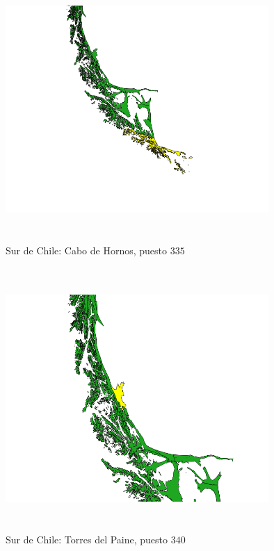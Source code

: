 \documentclass[20pt]{report}
\begin{document}
\begin{itemize}
\begin{figure}[H]
\begin{center}
\includegraphics[width=10cm, height=10cm]{cabodehornos.png}
\vspace{-0.5cm} %
\caption{Sur de Chile: Cabo de Hornos, puesto $335$}
\label{Label para referencia}
\end{center}
\end{figure}










\begin{figure}[H]
\begin{center}
\includegraphics[width=10cm, height=10cm]{torresdelpaine340.png}
\vspace{-0.5cm} %
\caption{Sur de Chile: Torres del Paine, puesto $340$}
\label{Label para referencia}
\end{center}
\end{figure}


\end{itemize}
\end{document}
